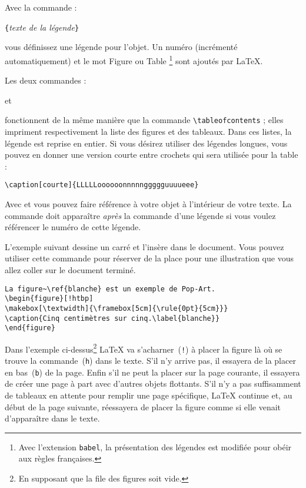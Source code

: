 Avec la commande :
\begin{lscommand}
\verb|{|\emph{texte de la légende}\verb|}|
\end{lscommand}
\noindent
vous définissez une légende pour l'objet. Un numéro (incrémenté
 automatiquement) et le mot \og Figure \fg{} ou
 \og Table \fg{}\footnote{Avec l'extension \texttt{babel}, la
 présentation des légendes est modifiée pour obéir aux règles
 françaises.} sont ajoutés par \LaTeX.

Les deux commandes :
\begin{lscommand}
 et 
\end{lscommand}
\noindent fonctionnent de la même manière que la commande
\verb|\tableofcontents| ; elles impriment respectivement la liste des
figures et des tableaux. Dans ces listes, la légende est reprise en
entier. Si vous désirez utiliser des légendes longues, vous pouvez
en donner une version courte entre crochets qui sera utilisée pour la
table :
\begin{code}
\verb|\caption[courte]{LLLLLoooooonnnnnggggguuuueee}|
\end{code}

Avec  et  vous pouvez faire référence à votre objet
à l'intérieur de votre texte. La commande  doit apparaître
\emph{après} la commande  d'une légende si vous voulez
référencer le numéro de cette légende.

L'exemple suivant dessine un carré et l'insère dans le document. Vous
pouvez utiliser cette commande pour réserver de la place pour une
illustration que vous allez coller sur le document terminé.

\begin{code}
\begin{verbatim}
La figure~\ref{blanche} est un exemple de Pop-Art.
\begin{figure}[!htbp]
\makebox[\textwidth]{\framebox[5cm]{\rule{0pt}{5cm}}}
\caption{Cinq centimètres sur cinq.\label{blanche}}
\end{figure}
\end{verbatim}
\end{code}

Dans l'exemple ci-dessus\footnote{En supposant que la file
des figures soit vide.} \LaTeX{} va s'acharner~(\texttt{!}) à
placer la figure là où se trouve la commande~(\texttt{h}) dans le
texte. S'il n'y arrive pas, il essayera de la placer en
bas~(\texttt{b}) de la page. Enfin s'il ne peut la placer sur la
page courante, il essayera de créer une page à part avec d'autres
objets flottants. S'il n'y a pas suffisamment de tableaux en attente
pour remplir une page spécifique, \LaTeX{} continue et, au début de la
page suivante, réessayera de placer la figure comme si elle venait
d'apparaître dans le texte.

